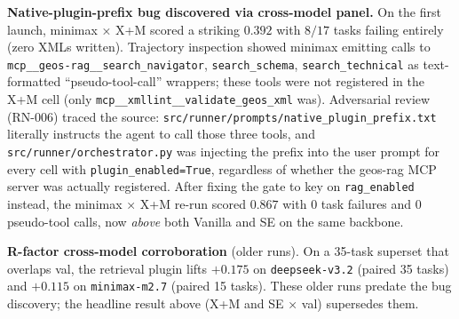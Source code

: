 \documentclass{article}
\begin{document}
\begin{table}[h]
  \caption{Full cross-model and cross-harness panel. Counts in parentheses are task failures out of 17. The minimax × X+M result of $0.392$ in italic is the pre-fix number reported in the project log; the corrected number ($0.867$) replaces it after the prefix-gate bug fix described below.}
  \label{tab:cross-cutting-full}
  \centering
  \small
\end{table}

\textbf{Native-plugin-prefix bug discovered via cross-model panel.} On the first launch, minimax × X+M scored a striking $0.392$ with $8/17$ tasks failing entirely (zero XMLs written). Trajectory inspection showed minimax emitting calls to \texttt{mcp\_\_geos-rag\_\_search\_navigator}, \texttt{search\_schema}, \texttt{search\_technical} as text-formatted ``pseudo-tool-call'' wrappers; these tools were not registered in the X+M cell (only \texttt{mcp\_\_xmllint\_\_validate\_geos\_xml} was). Adversarial review (RN-006) traced the source: \texttt{src/runner/prompts/native\_plugin\_prefix.txt} literally instructs the agent to call those three tools, and \texttt{src/runner/orchestrator.py} was injecting the prefix into the user prompt for every cell with \texttt{plugin\_enabled=True}, regardless of whether the geos-rag MCP server was actually registered. After fixing the gate to key on \texttt{rag\_enabled} instead, the minimax × X+M re-run scored $0.867$ with $0$ task failures and $0$ pseudo-tool calls, now \emph{above} both Vanilla and SE on the same backbone.

\textbf{R-factor cross-model corroboration} (older runs). On a 35-task superset that overlaps val, the retrieval plugin lifts $+0.175$ on \texttt{deepseek-v3.2} (paired 35 tasks) and $+0.115$ on \texttt{minimax-m2.7} (paired 15 tasks). These older runs predate the bug discovery; the headline result above (X+M and SE × val) supersedes them.
\end{document}
